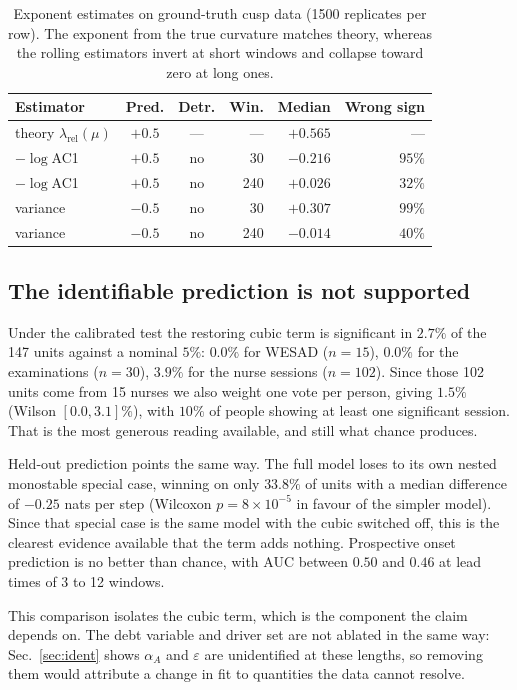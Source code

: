 \documentclass[conference]{IEEEtran}
\begin{document}
\begin{table}[tb]
\caption{Exponent estimates on ground-truth cusp data (1500 replicates per
row). The exponent from the true curvature matches theory, whereas the rolling
estimators invert at short windows and collapse toward zero at long ones.}
\label{tab:ewsval}
\centering
\begin{tabular}{@{}lccrrr@{}}
\toprule
Estimator & Pred. & Detr. & Win. & Median & Wrong sign \\
\midrule
theory $\lambda_{\text{rel}}(\mu)$ & $+0.5$ & --- & --- & $\mathbf{+0.565}$ & --- \\
\midrule
$-\log$AC1 & $+0.5$ & no & 30 & $-0.216$ & $95\%$ \\
$-\log$AC1 & $+0.5$ & no & 240 & $+0.026$ & $32\%$ \\
variance & $-0.5$ & no & 30 & $+0.307$ & $99\%$ \\
variance & $-0.5$ & no & 240 & $-0.014$ & $40\%$ \\
\bottomrule
\end{tabular}
\end{table}

\subsection{The identifiable prediction is not supported}
Under the calibrated test the restoring cubic term is significant in $2.7\%$ of
the 147 units against a nominal $5\%$: $0.0\%$ for WESAD ($n=15$), $0.0\%$ for
the examinations ($n=30$), $3.9\%$ for the nurse sessions ($n=102$). Since those 102 units come from 15 nurses we also weight one vote per person,
giving $1.5\%$ (Wilson $[0.0,3.1]\%$), with $10\%$ of people showing at least
one significant session. That is the most generous reading available, and still
what chance produces.

Held-out prediction points the same way. The full model loses to its own
nested monostable special case, winning on only $33.8\%$ of units with a
median difference of $-0.25$ nats per step (Wilcoxon $p=8\times10^{-5}$ in
favour of the simpler model). Since that special case is the same model with
the cubic switched off, this is the clearest evidence available that the term
adds nothing. Prospective onset prediction is no better than chance, with AUC
between $0.50$ and $0.46$ at lead times of 3 to 12 windows.

This comparison isolates the cubic term, which is the component the claim
depends on. The debt variable and driver set are not ablated in the same way:
Sec.~\ref{sec:ident} shows $\alpha_A$ and $\varepsilon$ are unidentified at
these lengths, so removing them would attribute a change in fit to quantities
the data cannot resolve.
\end{document}
